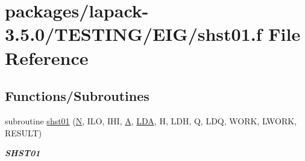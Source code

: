 \hypertarget{shst01_8f}{}\section{packages/lapack-\/3.5.0/\+T\+E\+S\+T\+I\+N\+G/\+E\+I\+G/shst01.f File Reference}
\label{shst01_8f}
\subsection*{Functions/\+Subroutines}
\begin{DoxyCompactItemize}
\item 
subroutine \hyperlink{group__single__eig_gac3cc6f97fd6bdc607aab5f8bd0034054}{shst01} (\hyperlink{polmisc_8c_a0240ac851181b84ac374872dc5434ee4}{N}, I\+L\+O, I\+H\+I, \hyperlink{classA}{A}, \hyperlink{example__user_8c_ae946da542ce0db94dced19b2ecefd1aa}{L\+D\+A}, H, L\+D\+H, Q, L\+D\+Q, W\+O\+R\+K, L\+W\+O\+R\+K, R\+E\+S\+U\+L\+T)
\begin{DoxyCompactList}\small\item\em {\bfseries S\+H\+S\+T01} \end{DoxyCompactList}\end{DoxyCompactItemize}
